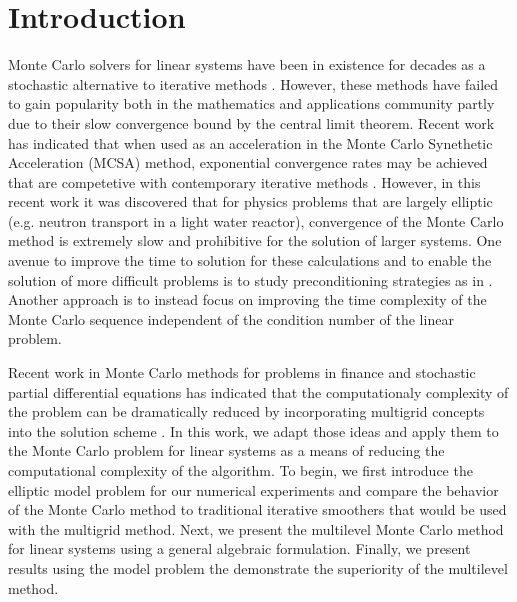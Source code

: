 \documentclass[note]{TechNote}
\begin{document}
\section{Introduction}
\label{sec:introduction}
Monte Carlo solvers for linear systems have been in existence for
decades as a stochastic alternative to iterative methods
\cite{forsythe_matrix_1950,wasow_note_1952,halton_sequential_1962,hammersley_monte_1964,spanier_monte_1969}. However,
these methods have failed to gain popularity both in the mathematics
and applications community partly due to their slow convergence bound
by the central limit theorem. Recent work has indicated that when used
as an acceleration in the Monte Carlo Synethetic Acceleration (MCSA)
method, exponential convergence rates may be achieved that are
competetive with contemporary iterative methods
\cite{evans_residual_2003,evans_monte_2009,evans_monte_2012,slattery_phd_2013}.
However, in this recent work it was discovered that for physics
problems that are largely elliptic (e.g. neutron transport in a light
water reactor), convergence of the Monte Carlo method is extremely
slow and prohibitive for the solution of larger systems. One avenue to
improve the time to solution for these calculations and to enable the
solution of more difficult problems is to study preconditioning
strategies as in \cite{slattery_phd_2013}. Another approach is to
instead focus on improving the time complexity of the Monte Carlo
sequence independent of the condition number of the linear problem.

Recent work in Monte Carlo methods for problems in finance and
stochastic partial differential equations has indicated that the
computationaly complexity of the problem can be dramatically reduced
by incorporating multigrid concepts into the solution scheme
\cite{heinrich_2001,giles_2008,cliffe_2011}. In this work, we adapt
those ideas and apply them to the Monte Carlo problem for linear
systems as a means of reducing the computational complexity of the
algorithm. To begin, we first introduce the elliptic model problem for
our numerical experiments and compare the behavior of the Monte Carlo
method to traditional iterative smoothers that would be used with the
multigrid method. Next, we present the multilevel Monte Carlo method
for linear systems using a general algebraic formulation. Finally, we
present results using the model problem the demonstrate the
superiority of the multilevel method.

\end{document}

